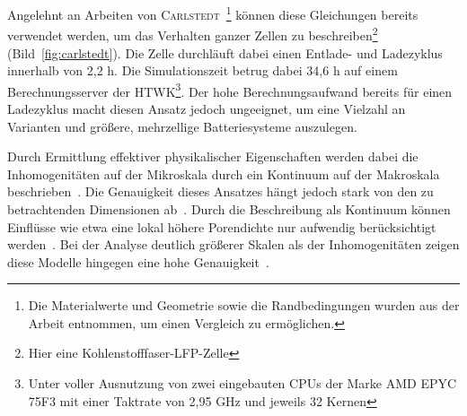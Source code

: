 Angelehnt an Arbeiten von \textsc{Carlstedt}~\cite{Carlstedt2022b}\footnote{Die Materialwerte und Geometrie sowie die Randbedingungen wurden aus der Arbeit entnommen, um einen Vergleich zu ermöglichen.} können diese Gleichungen bereits verwendet werden, um das Verhalten ganzer Zellen zu beschreiben\footnote{Hier eine Kohlenstofffaser-LFP-Zelle} (Bild~\ref{fig:carlstedt}). Die Zelle durchläuft dabei einen Entlade- und Ladezyklus innerhalb von 2{,}2 h. Die Simulationszeit betrug dabei 34{,}6 h auf einem Berechnungsserver der HTWK\footnote{Unter voller Ausnutzung von zwei eingebauten CPUs der Marke AMD EPYC 75F3 mit einer Taktrate von 2{,}95 GHz und jeweils 32 Kernen}. Der hohe Berechnungsaufwand bereits für einen Ladezyklus macht diesen Ansatz jedoch ungeeignet, um eine Vielzahl an Varianten und größere, mehrzellige Batteriesysteme auszulegen.

Durch Ermittlung effektiver physikalischer Eigenschaften werden dabei die Inhomogenitäten auf der Mikroskala durch ein Kontinuum auf der Makroskala beschrieben~\cite{Plett2024}. Die Genauigkeit dieses Ansatzes hängt jedoch stark von den zu betrachtenden Dimensionen ab~\cite{Plett2015}. Durch die Beschreibung als Kontinuum können Einflüsse wie etwa eine lokal höhere Porendichte nur aufwendig berücksichtigt werden~\cite{Mei2019}. Bei der Analyse deutlich größerer Skalen als der Inhomogenitäten zeigen diese Modelle hingegen eine hohe Genauigkeit~\cite{Plett2015}. 


